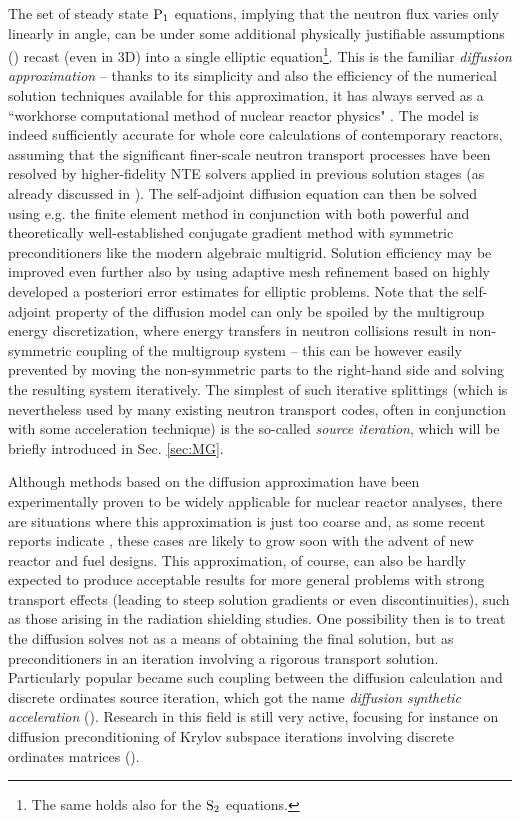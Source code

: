 The set of steady state $\PN[1]$ equations, implying that the neutron flux varies only linearly in angle, can be under
some additional physically justifiable assumptions (\cite{Stacey, Reuss}) recast (even in 3D) into a single elliptic
equation\footnote{The same holds also for the $\SN[2]$ equations.}. This is the familiar \textit{diffusion approximation} -- thanks to its
simplicity and also the efficiency of the numerical solution techniques available for this approximation, it has always
served as a ``workhorse computational method of nuclear reactor physics" \cite[p. 43]{Stacey1}. The model is indeed
sufficiently accurate for whole core calculations of contemporary reactors, assuming that the significant finer-scale
neutron transport processes have been resolved by higher-fidelity NTE solvers applied in previous solution stages (as
already discussed in \sref{}).
The self-adjoint diffusion equation can then be solved using e.g. the finite element method in conjunction with both
powerful and theoretically well-established conjugate gradient method with symmetric preconditioners like the modern
algebraic multigrid. Solution efficiency may be improved even further also by using adaptive mesh refinement based on
highly developed a posteriori error estimates for elliptic problems. Note that the self-adjoint property of the
diffusion model can only be spoiled by the multigroup energy discretization, where energy transfers in neutron
collisions result in non-symmetric coupling of the multigroup system -- this can be however easily prevented by moving
the non-symmetric parts to the right-hand side and solving the resulting system iteratively. The simplest of such
iterative splittings (which is nevertheless used by many existing neutron transport codes, often in conjunction with
some acceleration technique) is the so-called \textit{source iteration}, which will be briefly introduced in Sec.
\ref{sec:MG}.

Although methods based on the diffusion approximation have been experimentally proven to be widely applicable for
nuclear reactor analyses, there are situations where this approximation is just too coarse and, as some recent reports
indicate \cite{Hejzlar1,Cho1}, these cases are likely to grow soon with the advent of new reactor and fuel designs. This
approximation, of course, can also be hardly expected to produce acceptable results for more general problems with
strong transport effects (leading to steep solution gradients or even discontinuities), such as those arising in the
radiation shielding studies. One possibility then is to treat the diffusion solves not as a means of obtaining the final
solution, but as preconditioners in an iteration involving a rigorous transport solution. Particularly popular became
such coupling between the diffusion calculation and discrete ordinates source iteration, which got the name
\textit{diffusion synthetic acceleration} (\cite{Alcouffe1}). Research in this field is still very active, focusing for
instance on diffusion preconditioning of Krylov subspace iterations involving discrete ordinates matrices (\cite[Chap.
1]{Azmy1}).

